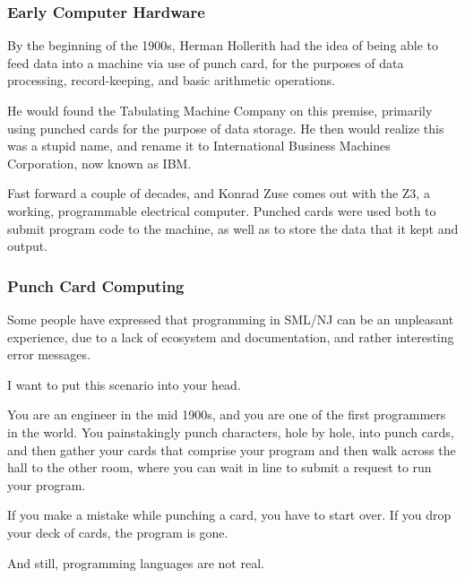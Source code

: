 \documentclass[aspectratio=169]{beamer}
\begin{document}
\begin{frame}[fragile]
  \frametitle{Early Computer Hardware}

  By the beginning of the 1900s, Herman Hollerith had the idea of being able to
  feed data into a machine via use of punch card, for the purposes of data
  processing, record-keeping, and basic arithmetic operations.

  \vspace{\fill}

  He would found the Tabulating Machine Company on this premise, primarily
  using punched cards for the purpose of data storage. He then would realize
  this was a stupid name, and rename it to International Business Machines
  Corporation, now known as IBM.

  \vspace{\fill}

  Fast forward a couple of decades, and Konrad Zuse comes out with the Z3, a
  working, programmable electrical computer. Punched cards were used both to
  submit program code to the machine, as well as to store the data that it
  kept and output.
\end{frame}

\begin{frame}[fragile]
  \frametitle{Punch Card Computing}

  Some people have expressed that programming in SML/NJ can be an unpleasant
  experience, due to a lack of ecosystem and documentation, and rather
  interesting error messages.

  \vspace{\fill}

  I want to put this scenario into your head.

  \vspace{\fill}

  You are an engineer in the mid 1900s, and you are one of the first programmers
  in the world. You painstakingly punch characters, hole by hole, into punch cards,
  and then gather your cards that comprise your program and then walk across the
  hall to the other room, where you can wait in line to submit a request to
  run your program.

  \vspace{\fill}

  If you make a mistake while punching a card, you have to start over. If you
  drop your deck of cards, the program is gone.

  \vspace{\fill}

  And still, programming languages are not real.
\end{frame}
\end{document}
